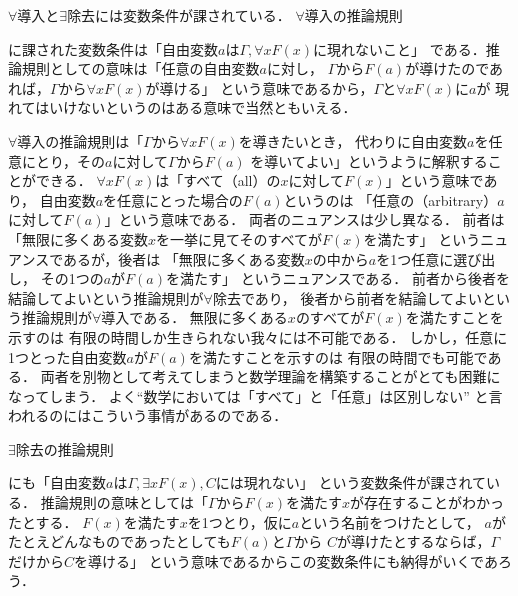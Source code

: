  $\forall$導入と$\exists$除去には変数条件が課されている．
 $\forall$導入の推論規則
 \begin{prooftree}
 \end{prooftree}
 に課された変数条件は「自由変数$a$は$\varGamma ,  \forall x F(x)$に現れないこと」
 である．推論規則としての意味は「任意の自由変数$a$に対し，
 $\varGamma$から$F(a)$が導けたのであれば，$\varGamma$から$\forall x F(x)$が導ける」
 という意味であるから，$\varGamma$と$\forall x F(x)$に$a$が
 現れてはいけないというのはある意味で当然ともいえる．

 $\forall$導入の推論規則は「$\varGamma$から$\forall x F(x)$を導きたいとき，
 代わりに自由変数$a$を任意にとり，その$a$に対して$\varGamma$から$F(a)$
 を導いてよい」というように解釈することができる．
 $\forall x F(x)$は「すべて（all）の$x$に対して$F(x)$」という意味であり，
 自由変数$a$を任意にとった場合の$F(a)$というのは
 「任意の（arbitrary）$a$に対して$F(a)$」という意味である．
 両者のニュアンスは少し異なる．
 前者は「無限に多くある変数$x$を一挙に見てそのすべてが$F(x)$を満たす」
 というニュアンスであるが，後者は
 「無限に多くある変数$x$の中から$a$を1つ任意に選び出し，
 その1つの$a$が$F(a)$を満たす」
 というニュアンスである．
 前者から後者を結論してよいという推論規則が$\forall$除去であり，
 後者から前者を結論してよいという推論規則が$\forall$導入である．
 無限に多くある$x$のすべてが$F(x)$を満たすことを示すのは
 有限の時間しか生きられない我々には不可能である．
 しかし，任意に1つとった自由変数$a$が$F(a)$を満たすことを示すのは
 有限の時間でも可能である．
 両者を別物として考えてしまうと数学理論を構築することがとても困難になってしまう．
 よく``数学においては「すべて」と「任意」は区別しない''
 と言われるのにはこういう事情があるのである．

 $\exists$除去の推論規則
 \begin{prooftree}
 \end{prooftree}
 にも「自由変数$a$は$\varGamma ,  \exists x F(x),  C$には現れない」
 という変数条件が課されている．
 推論規則の意味としては「$\varGamma$から$F(x)$を満たす$x$が存在することがわかったとする．
 $F(x)$を満たす$x$を1つとり，仮に$a$という名前をつけたとして，
 $a$がたとえどんなものであったとしても$F(a)$と$\varGamma$から
 $C$が導けたとするならば，$\varGamma$だけから$C$を導ける」
 という意味であるからこの変数条件にも納得がいくであろう．



